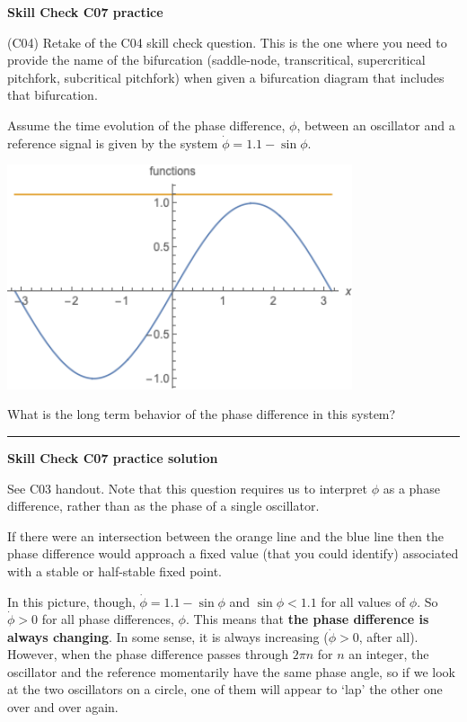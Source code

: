 \documentclass[12pt,letterpaper,noanswers]{exam}
\begin{document}
\noindent\textbf{Skill Check C07 practice}
\begin{questions}
\item (C04) Retake of the C04 skill check question.  This is the one where you need to provide the name of the bifurcation (saddle-node, transcritical, supercritical pitchfork, subcritical pitchfork) when given a bifurcation diagram that includes that bifurcation.
\item Assume the time evolution of the phase difference, $\phi$, between an oscillator and a reference signal is given by the system $\dot\phi = 1.1-\sin\phi$.

\includegraphics[width=4in]{img/C07-2019-09-18plot2.png}

What is the long term behavior of the phase difference in this system?


\end{questions}




\vspace{0.2cm}

\hrule
\vspace{0.2cm}

\noindent\textbf{Skill Check C07 practice solution}

\begin{questions}
\question See C03 handout.
\question Note that this question requires us to interpret $\phi$ as a phase difference, rather than as the phase of a single oscillator.

If there were an intersection between the orange line and the blue line then the phase difference would approach a fixed value (that you could identify) associated with a stable or half-stable fixed point.

In this picture, though, $\dot\phi = 1.1 - \sin\phi$ and $\sin\phi < 1.1$ for all values of $\phi$.  So $\dot\phi > 0$ for all phase differences, $\phi$.  This means that \textbf{the phase difference is always changing}.  In some sense, it is always increasing ($\dot\phi>0$, after all).  However, when the phase difference passes through $2\pi n$ for $n$ an integer, the oscillator and the reference momentarily have the same phase angle, so if we look at the two oscillators on a circle, one of them will appear to `lap' the other one over and over again. 
\end{questions}
\end{document}
